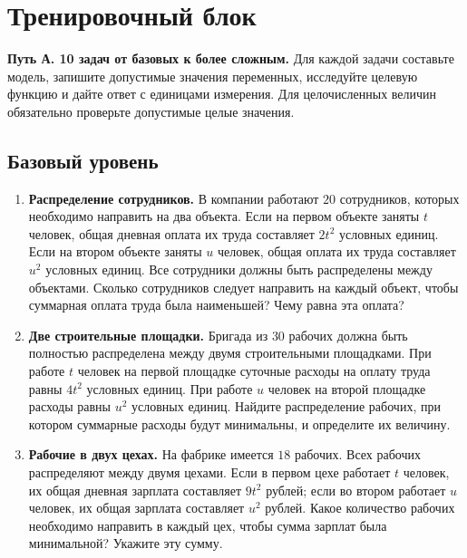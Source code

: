 \documentclass[a4paper,12pt]{article}
\begin{document}
\section*{Тренировочный блок}
\textcolor{darkaccent}{\textbf{Путь А. 10 задач от базовых к более сложным.}} Для каждой задачи составьте модель, запишите допустимые значения переменных, исследуйте целевую функцию и дайте ответ с единицами измерения. Для целочисленных величин обязательно проверьте допустимые целые значения.

\subsection*{Базовый уровень}
\begingroup\small{}
\setlength{\parskip}{2pt}
\begin{enumerate}[label=\textbf{\arabic*.},start=1]
\item \textbf{Распределение сотрудников.} В компании работают $20$ сотрудников, которых необходимо направить на два объекта. Если на первом объекте заняты $t$ человек, общая дневная оплата их труда составляет $2t^2$ условных единиц. Если на втором объекте заняты $u$ человек, общая оплата их труда составляет $u^2$ условных единиц. Все сотрудники должны быть распределены между объектами. Сколько сотрудников следует направить на каждый объект, чтобы суммарная оплата труда была наименьшей? Чему равна эта оплата?

\item \textbf{Две строительные площадки.} Бригада из $30$ рабочих должна быть полностью распределена между двумя строительными площадками. При работе $t$ человек на первой площадке суточные расходы на оплату труда равны $4t^2$ условных единиц. При работе $u$ человек на второй площадке расходы равны $u^2$ условных единиц. Найдите распределение рабочих, при котором суммарные расходы будут минимальны, и определите их величину.

\item \textbf{Рабочие в двух цехах.} На фабрике имеется $18$ рабочих. Всех рабочих распределяют между двумя цехами. Если в первом цехе работает $t$ человек, их общая дневная зарплата составляет $9t^2$ рублей; если во втором работает $u$ человек, их общая зарплата составляет $u^2$ рублей. Какое количество рабочих необходимо направить в каждый цех, чтобы сумма зарплат была минимальной? Укажите эту сумму.
\end{enumerate}
\end{document}
